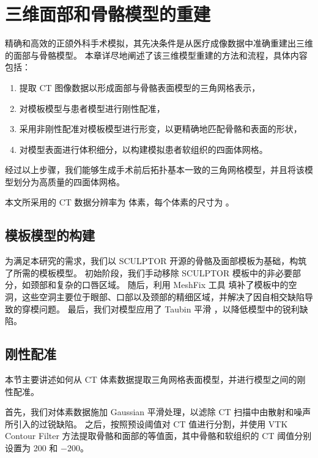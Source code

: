 
\chapter{三维面部和骨骼模型的重建}
\label{cha:reconstruction}

精确和高效的正颌外科手术模拟，其先决条件是从医疗成像数据中准确重建出三维的面部与骨骼模型。
本章详尽地阐述了该三维模型重建的方法和流程，具体内容包括：
\begin{enumerate}
  \item 提取 CT 图像数据以形成面部与骨骼表面模型的三角网格表示，
  \item 对模板模型与患者模型进行刚性配准，
  \item 采用非刚性配准对模板模型进行形变，以更精确地匹配骨骼和表面的形状，
  \item 对模型表面进行体积细分，以构建模拟患者软组织的四面体网格。
\end{enumerate}
经过以上步骤，我们能够生成手术前后拓扑基本一致的三角网格模型，并且将该模型划分为高质量的四面体网格。

本文所采用的 CT 数据分辨率为  体素，每个体素的尺寸为 。

\section{模板模型的构建}

为满足本研究的需求，我们以 SCULPTOR \cite{qiuSCULPTORSkeletonconsistentFace2022a} 开源的骨骼及面部模板为基础，构筑了所需的模板模型。
初始阶段，我们手动移除 SCULPTOR 模板中的非必要部分，如颈部和复杂的口唇区域。
随后，利用 MeshFix 工具 \cite{atteneLightweightApproachRepairing2010} 填补了模板中的空洞，这些空洞主要位于眼部、口部以及颈部的精细区域，并解决了因自相交缺陷导致的穿模问题。
最后，我们对模型应用了 Taubin 平滑 \cite{vollmerImprovedLaplacianSmoothing1999}，以降低模型中的锐利缺陷。

\section{刚性配准}

本节主要讲述如何从 CT 体素数据提取三角网格表面模型，并进行模型之间的刚性配准。

首先，我们对体素数据施加 Gaussian 平滑处理，以滤除 CT 扫描中由散射和噪声所引入的过锐缺陷。
之后，按照预设阈值对 CT 值进行分割，并使用 VTK Contour Filter 方法提取骨骼和面部的等值面，其中骨骼和软组织的 CT 阈值分别设置为 \num{200} 和 \num{-200}。

